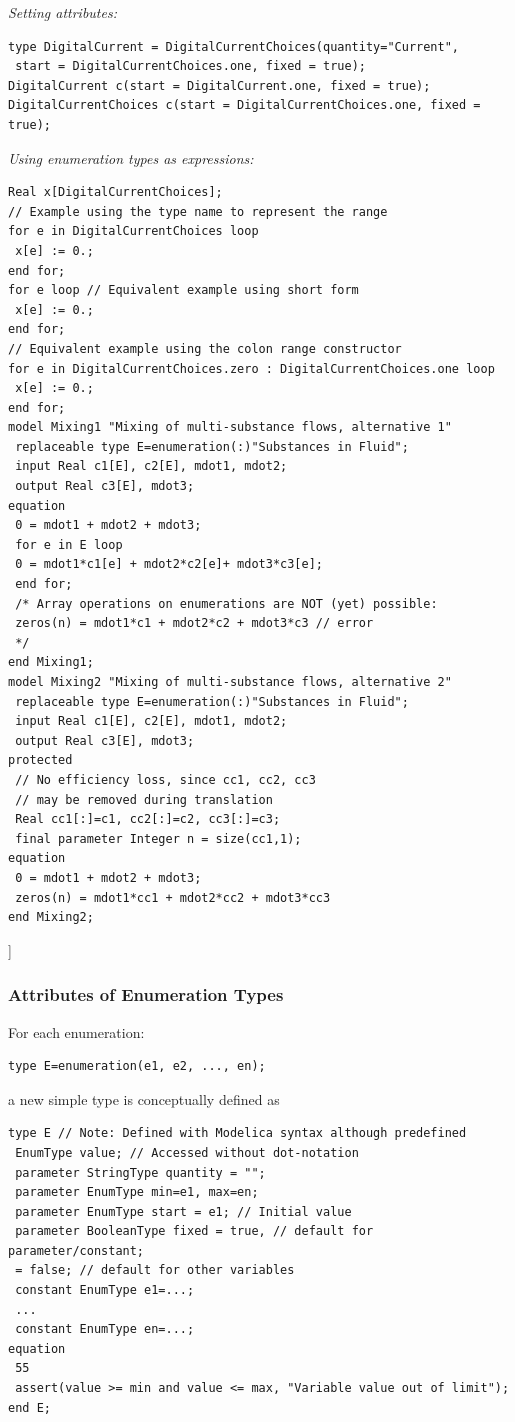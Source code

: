 \documentclass[10pt,a4paper]{report}
\def\Mcommentend#1{\emph{#1}{]}}
\def\Mcommentmid#1{\emph{#1}}
\def\doublelabel#1{\label{#1}\hypertarget{#1}{}}
\begin{document}
\Mcommentmid{Setting attributes: }
\begin{lstlisting}[language=modelica]
type DigitalCurrent = DigitalCurrentChoices(quantity="Current",
 start = DigitalCurrentChoices.one, fixed = true);
DigitalCurrent c(start = DigitalCurrent.one, fixed = true);
DigitalCurrentChoices c(start = DigitalCurrentChoices.one, fixed = true);
\end{lstlisting}
\Mcommentmid{Using enumeration types as expressions:}
\begin{lstlisting}[language=modelica]
Real x[DigitalCurrentChoices];
// Example using the type name to represent the range
for e in DigitalCurrentChoices loop
 x[e] := 0.;
end for;
for e loop // Equivalent example using short form
 x[e] := 0.;
end for;
// Equivalent example using the colon range constructor
for e in DigitalCurrentChoices.zero : DigitalCurrentChoices.one loop
 x[e] := 0.;
end for;
model Mixing1 "Mixing of multi-substance flows, alternative 1"
 replaceable type E=enumeration(:)"Substances in Fluid";
 input Real c1[E], c2[E], mdot1, mdot2;
 output Real c3[E], mdot3;
equation
 0 = mdot1 + mdot2 + mdot3;
 for e in E loop
 0 = mdot1*c1[e] + mdot2*c2[e]+ mdot3*c3[e];
 end for;
 /* Array operations on enumerations are NOT (yet) possible:
 zeros(n) = mdot1*c1 + mdot2*c2 + mdot3*c3 // error
 */
end Mixing1;
model Mixing2 "Mixing of multi-substance flows, alternative 2"
 replaceable type E=enumeration(:)"Substances in Fluid";
 input Real c1[E], c2[E], mdot1, mdot2;
 output Real c3[E], mdot3;
protected
 // No efficiency loss, since cc1, cc2, cc3
 // may be removed during translation
 Real cc1[:]=c1, cc2[:]=c2, cc3[:]=c3;
 final parameter Integer n = size(cc1,1);
equation
 0 = mdot1 + mdot2 + mdot3;
 zeros(n) = mdot1*cc1 + mdot2*cc2 + mdot3*cc3
end Mixing2;
\end{lstlisting}
\Mcommentend{}

\subsubsection{Attributes of Enumeration Types}\doublelabel{attributes-of-enumeration-types}

For each enumeration:
\begin{lstlisting}[language=modelica]
type E=enumeration(e1, e2, ..., en); 
\end{lstlisting}

a new simple type is conceptually defined as

\begin{lstlisting}[language=modelica]
type E // Note: Defined with Modelica syntax although predefined
 EnumType value; // Accessed without dot-notation
 parameter StringType quantity = "";
 parameter EnumType min=e1, max=en;
 parameter EnumType start = e1; // Initial value
 parameter BooleanType fixed = true, // default for parameter/constant;
 = false; // default for other variables
 constant EnumType e1=...;
 ...
 constant EnumType en=...;
equation
 55
 assert(value >= min and value <= max, "Variable value out of limit");
end E;
\end{lstlisting}
\end{document}
